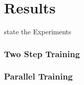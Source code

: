 \chapter{Results}

state the Experiments 

\subsection{Two Step Training}


\subsection{Parallel Training}

